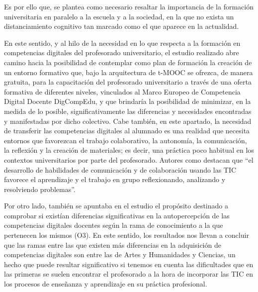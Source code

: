 \documentclass[spanish]{textolivre}
\begin{document}
Es por ello que, se plantea como necesario resaltar la importancia de la formación universitaria en paralelo a la escuela y a la sociedad, en la que no exista un distanciamiento cognitivo tan marcado como el que aparece en la actualidad. 

En este sentido, y al hilo de la necesidad en lo que respecta a la formación en competencias digitales del profesorado universitario, el estudio realizado abre camino hacia la posibilidad de contemplar como plan de formación la creación de un entorno formativo que, bajo la arquitectura de t-MOOC se ofrezca, de manera gratuita, para la capacitación del profesorado universitario a través de una oferta formativa de diferentes niveles, vinculados al Marco Europeo de Competencia Digital Docente DigCompEdu, y que brindaría la posibilidad de minimizar, en la medida de lo posible, significativamente las diferencias y necesidades encontradas y manifestadas por dicho colectivo.  
Cabe también, en este apartado, la necesidad de transferir las competencias digitales al alumnado es una realidad que necesita entornos que favorezcan el trabajo colaborativo, la autonomía, la comunicación, la reflexión y la creación de materiales; es decir, una práctica poco habitual en los contextos universitarios por parte del profesorado. Autores como \textcite[p. 141]{garcia-valcarcel2017} destacan que “el desarrollo de habilidades de comunicación y de colaboración usando las TIC favorece el aprendizaje y el trabajo en grupo reflexionando, analizando y resolviendo problemas”.

Por otro lado, también se apuntaba en el estudio el propósito destinado a comprobar si existían diferencias significativas en la autopercepción de las competencias digitales docentes según la rama de conocimiento a la que pertenecen los mismos (O3). En este sentido, los resultados nos llevan a concluir que las ramas entre las que existen más diferencias en la adquisición de competencias digitales son entre las de Artes y Humanidades y Ciencias, un hecho que puede resultar significativo si tenemos en cuenta las dificultades que en las primeras se suelen encontrar el profesorado a la hora de incorporar las TIC en los procesos de enseñanza y aprendizaje en su práctica profesional. 
\end{document}
